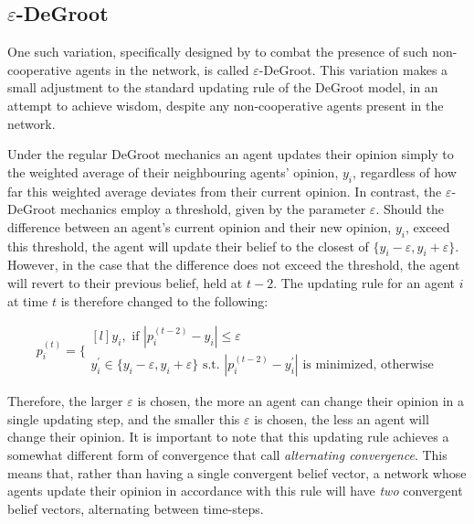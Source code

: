 \documentclass[a4paper, 12pt]{report}
\newcommand{\beli}[3][2]{p_{#2}^{(#3)}}
\begin{document}
\subsection{$\varepsilon$-DeGroot}

One such variation, specifically designed by \parencite{amir2021robust} to combat the presence of such non-cooperative agents in the network, is called $\varepsilon$-DeGroot. This variation makes a small adjustment to the standard updating rule of the DeGroot model, in an attempt to achieve wisdom, despite any non-cooperative agents present in the network.

\noindent Under the regular DeGroot mechanics an agent updates their opinion simply to the weighted average of their neighbouring agents' opinion, $y_i$, regardless of how far this weighted average deviates from their current opinion. In contrast, the $\varepsilon$-DeGroot mechanics employ a threshold, given by the parameter $\varepsilon$. Should the difference between an agent's current opinion and their new opinion, $y_i$, exceed this threshold, the agent will update their belief to the closest of $\{y_i - \varepsilon, y_i + \varepsilon\}$. However, in the case that the difference does not exceed the threshold, the agent will revert to their previous belief, held at $t-2$. The updating rule for an agent $i$ at time $t$ is therefore changed to the following:

\begin{equation*}
    \label{edegroot:updating}
  \beli{i}{t} =\Bigg\{
  \begin{matrix*}[l]
  y_i, \text{ if } |\beli{i}{t-2} - y_i| \leq \varepsilon\\
  y_i^{\prime}\in\{y_i-\varepsilon, y_i+\varepsilon\}\text{ s.t. }|\beli{i}{t-2} - y_i^{\prime}|\text{ is minimized, otherwise}
  \end{matrix*}
\end{equation*}

\noindent Therefore, the larger $\varepsilon$ is chosen, the more an agent can change their opinion in a single updating step, and the smaller this $\varepsilon$ is chosen, the less an agent will change their opinion. It is important to note that this updating rule achieves a somewhat different form of convergence that \parencite{amir2021robust} call \emph{alternating convergence}. This means that, rather than having a single convergent belief vector, a network whose agents update their opinion in accordance with this rule will have \emph{two} convergent belief vectors, alternating between time-steps.
\end{document}

